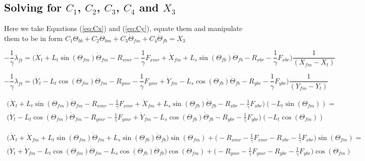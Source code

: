 \documentclass[11pt, landscape]{article}
\begin{document}
\subsection{Solving for $C_1$, $C_2$, $C_3$, $C_4$ and $X_3$}
Here we take Equations (\ref{eq:Cx}) and (\ref{eq:Cy}), equate them and manipulate them to be in form $ C_1\dot{\Theta}_{bb} + C_2 \dot{\Theta}_{bm} + C_3 \dot{\Theta}_{fm} + C_4 \dot{\Theta}_{fb} = X_3$

\begin{equation}
-\frac{1}{\gamma}\lambda_{ft} = \Big( \dot{X}_{t } + L_{t}\sin(\Theta_{fm})\dot{\Theta}_{fm} - R_{xmr} - \frac{1}{\gamma}F_{xmr}
+ \dot{X}_{fm} + L_{s}\sin(\Theta_{fb})\dot{\Theta}_{fb} - R_{xbr} - \frac{1}{\gamma}F_{xbr}\Big) \frac{1}{(X_{fm} - X_{t })}
\end{equation}

\begin{equation}
-\frac{1}{\gamma}\lambda_{ft} = \Big( \dot{Y}_{t } - L_{t}\cos(\Theta_{fm})\dot{\Theta}_{fm} - R_{ymr} - \frac{1}{\gamma}F_{ymr}
+ \dot{Y}_{fm} - L_{s}\cos(\Theta_{fb})\dot{\Theta}_{fb} - R_{ybr} - \frac{1}{\gamma}F_{ybr}\Big) \frac{1}{(Y_{fm} - Y_{t })}
\end{equation}

\begin{multline}
\Big( \dot{X}_{t } + L_{t}\sin(\Theta_{fm})\dot{\Theta}_{fm} - R_{xmr} - \frac{1}{\gamma}F_{xmr}
+ \dot{X}_{fm} + L_{s}\sin(\Theta_{fb})\dot{\Theta}_{fb} - R_{xbr} - \frac{1}{\gamma}F_{xbr}\Big)(-L_{t}\sin(\Theta_{fm})) = \\
\Big( \dot{Y}_{t } - L_{t}\cos(\Theta_{fm})\dot{\Theta}_{fm} - R_{ymr} - \frac{1}{\gamma}F_{ymr}
+ \dot{Y}_{fm} - L_{s}\cos(\Theta_{fb})\dot{\Theta}_{fb} - R_{ybr} - \frac{1}{\gamma}F_{ybr}\Big)(-L_{t}\cos(\Theta_{fm}))
\end{multline}

\begin{multline}
\Big( \dot{X}_{t } + \dot{X}_{fm} + L_{t}\sin(\Theta_{fm})\dot{\Theta}_{fm} + L_{s}\sin(\Theta_{fb})\dot{\Theta}_{fb} \Big)\sin(\Theta_{fm}) +
\Big(- R_{xmr} - \frac{1}{\gamma}F_{xmr} - R_{xbr} - \frac{1}{\gamma}F_{xbr}\Big)\sin(\Theta_{fm}) = \\
\Big(\dot{Y}_{t } + \dot{Y}_{fm} - L_{t}\cos(\Theta_{fm})\dot{\Theta}_{fm} - L_{s}\cos(\Theta_{fb})\dot{\Theta}_{fb}\Big)\cos(\Theta_{fm}) +
\Big(- R_{ymr} - \frac{1}{\gamma}F_{ymr} - R_{ybr} - \frac{1}{\gamma}F_{ybr}\Big)\cos(\Theta_{fm})
\end{multline}
\end{document}

